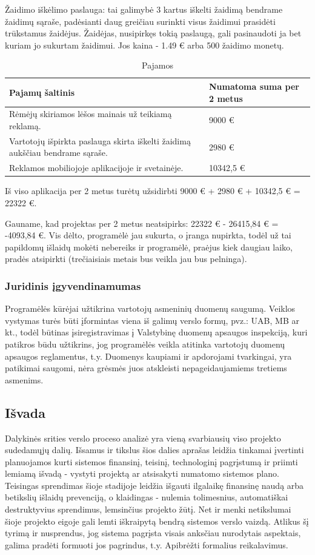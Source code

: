 \documentclass{VUMIFPSkursinis}
\begin{document}
		Žaidimo iškėlimo paslauga: tai galimybė 3 kartus iškelti žaidimą bendrame
		žaidimų sąraše, padėsianti daug greičiau surinkti visus žaidimui prasidėti 
		trūkstamus žaidėjus. Žaidėjas, nusipirkęs tokią paslaugą, gali pasinaudoti 
		ja bet kuriam jo sukurtam žaidimui. Jos kaina - 1.49 € arba 500 žaidimo 
		monetų.

		\begin{longtable}{ | m{10cm} | m{6cm} | }
		\caption{Pajamos}
		\label{variability_impl_mech}
		\endhead
		 \hline			

		\textbf{Pajamų šaltinis} & \textbf{Numatoma suma per 2 metus} \tabularnewline \hline
		Rėmėjų skiriamos lėšos mainais už teikiamą reklamą. & 9000 € \tabularnewline \hline
		Vartotojų išpirkta paslauga skirta iškelti žaidimą aukščiau bendrame sąraše. & 2980  € \tabularnewline \hline
		Reklamos mobiliojoje aplikacijoje ir svetainėje. & 10342,5 €\tabularnewline \hline
		\end{longtable}
		
		Iš viso aplikacija per 2 metus turėtų užsidirbti 9000 € + 2980 € + 10342,5 €
		= 22322 €.

		Gauname, kad projektas per 2 metus neatsipirks: 22322 € - 26415,84 € = 
		-4093,84 €. Vis dėlto, programėlė jau sukurta, o įranga nupirkta, todėl 
		už tai papildomų išlaidų mokėti nebereiks ir programėlė, praėjus kiek 
		daugiau laiko, pradės atsipirkti (trečiaisiais metais bus veikla jau bus 
		pelninga).
		
	\subsubsection{Juridinis įgyvendinamumas}
		Programėlės kūrėjai užtikrina vartotojų asmeninių duomenų saugumą. 
		Veiklos vystymas turės būti įformintas viena iš galimų verslo formų, 
		pvz.: UAB, MB ar kt., todėl būtinas įsiregistravimas į Valstybinę 
		duomenų apsaugos inspekciją, kuri patikros būdu užtikrins, jog 
		programėlės veikla atitinka vartotojų duomenų apsaugos reglamentus, 
		t.y. Duomenys kaupiami ir apdorojami tvarkingai, yra patikimai saugomi, 
		nėra grėsmės juos atskleisti nepageidaujamiems tretiems asmenims.
		
\subsection{Išvada}
	Dalykinės srities verslo proceso analizė yra vieną svarbiausių viso projekto 
	sudedamųjų dalių. Išsamus ir tikslus šios dalies aprašas leidžia tinkamai 
	įvertinti planuojamos kurti sistemos finansinį, teisinį, technologinį 
	pagrįstumą ir priimti lemiamą išvadą - vystyti projektą ar atsisakyti 
	numatomo sistemos plano. Teisingas sprendimas šioje stadijoje leidžia 
	išgauti ilgalaikę finansinę naudą arba betikslių išlaidų prevenciją, o 
	klaidingas - nulemia tolimesnius, automatiškai destruktyvius sprendimus, 
	lemsinčius projekto žūtį. Net ir menki netikslumai šioje projekto eigoje 
	gali lemti iškraipytą bendrą sistemos verslo vaizdą. Atlikus šį tyrimą ir 
	nusprendus, jog sistema pagrįsta visais anksčiau nurodytais aspektais, galima 
	pradėti formuoti jos pagrindus, t.y. Apibrėžti formalius reikalavimus.
\end{document}
